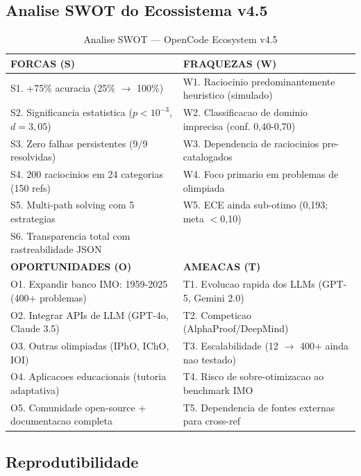 \documentclass[5p]{elsarticle}
\begin{document}
\subsection{Analise SWOT do Ecossistema v4.5}

\begin{table}[H]
  \centering
  \caption{Analise SWOT — OpenCode Ecosystem v4.5}
  \label{tab:swot}
  \small
  \begin{tabular}{p{7cm}p{7cm}}
    \toprule
    \textbf{FORCAS (S)} & \textbf{FRAQUEZAS (W)} \\
    \midrule
    S1. +75\% acuracia (25\% $\to$ 100\%) & W1. Raciocinio predominantemente heuristico (simulado) \\
    S2. Significancia estatistica ($p<10^{-3}$, $d=3,05$) & W2. Classificacao de dominio imprecisa (conf. 0,40-0,70) \\
    S3. Zero falhas persistentes (9/9 resolvidas) & W3. Dependencia de raciocinios pre-catalogados \\
    S4. 200 raciocinios em 24 categorias (150 refs) & W4. Foco primario em problemas de olimpiada \\
    S5. Multi-path solving com 5 estrategias & W5. ECE ainda sub-otimo (0,193; meta $<$0,10) \\
    S6. Transparencia total com rastreabilidade JSON & \\
    \midrule
    \textbf{OPORTUNIDADES (O)} & \textbf{AMEACAS (T)} \\
    \midrule
    O1. Expandir banco IMO: 1959-2025 (400+ problemas) & T1. Evolucao rapida dos LLMs (GPT-5, Gemini 2.0) \\
    O2. Integrar APIs de LLM (GPT-4o, Claude 3.5) & T2. Competicao (AlphaProof/DeepMind) \\
    O3. Outras olimpiadas (IPhO, IChO, IOI) & T3. Escalabilidade (12 $\to$ 400+ ainda nao testado) \\
    O4. Aplicacoes educacionais (tutoria adaptativa) & T4. Risco de sobre-otimizacao ao benchmark IMO \\
    O5. Comunidade open-source + documentacao completa & T5. Dependencia de fontes externas para cross-ref \\
    \bottomrule
  \end{tabular}
\end{table}

\subsection{Reprodutibilidade}
\end{document}
